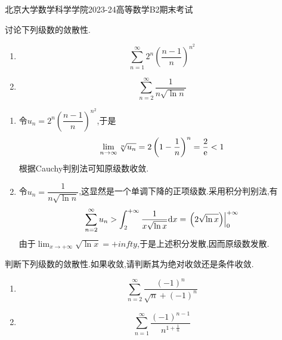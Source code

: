 \documentclass{ctexart}
\begin{document}
\pagestyle{empty}
\begin{center}\Large
    北京大学数学科学学院2023-24高等数学B2期末考试
\end{center}
\begin{problem}[1.(14\songti{分})]
    讨论下列级数的敛散性.
    \begin{enumerate}[label=\tbf{(\arabic*)},topsep=0pt,parsep=0pt,itemsep=0pt,partopsep=0pt]
        \item \[\sum_{n=1}^{\infty}2^n\left(\dfrac{n-1}{n}\right)^{n^2}\]
        \item \[\sum_{n=2}^{\infty}\dfrac{1}{n\sqrt{\ln n}}\]
    \end{enumerate}

\end{problem}
\begin{solution}
    \begin{enumerate}[label=\tbf{(\arabic*)},topsep=0pt,parsep=0pt,itemsep=0pt,partopsep=0pt]
        \item 令$u_n=2^n\left(\dfrac{n-1}{n}\right)^{n^2}$,于是
            \[\lim_{n\to\infty}\sqrt[n]{u_n}=2\left(1-\dfrac1n\right)^n=\dfrac{2}{\mathrm{e}}<1\]
            根据Cauchy判别法可知原级数收敛.
        \item 令$u_n=\dfrac{1}{n\sqrt{\ln n}}$,这显然是一个单调下降的正项级数.采用积分判别法,有
            \[\sum_{n=2}^{\infty}u_n>\int_2^{+\infty}\dfrac{1}{x\sqrt{\ln x}}\mathrm{d} x
            =\left.\left(2\sqrt{\ln x}\right)\right|_0^{+\infty}\]
            由于$\displaystyle\lim_{x\to+\infty}\sqrt{\ln x}=+infty$,于是上述积分发散,因而原级数发散.
    \end{enumerate}
\end{solution}
\begin{problem}[2.(14\songti{分})]
    判断下列级数的敛散性.如果收敛,请判断其为绝对收敛还是条件收敛.
    \begin{enumerate}[label=\tbf{(\arabic*)},topsep=0pt,parsep=0pt,itemsep=0pt,partopsep=0pt]
        \item \[\sum_{n=2}^{\infty}\dfrac{(-1)^n}{\sqrt{n}+(-1)^n}\]
        \item \[\sum_{n=1}^{\infty}\dfrac{(-1)^{n-1}}{n^{1+\frac1n}}\]
    \end{enumerate}

\end{problem}
\end{document}
